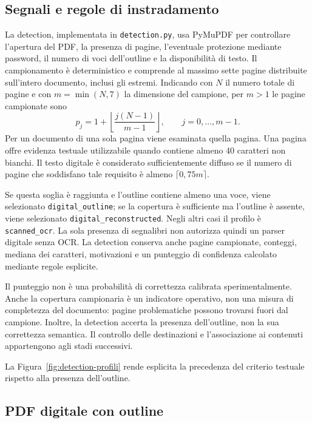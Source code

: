 \subsection{Segnali e regole di instradamento}

La detection, implementata in \texttt{detection.py}, usa PyMuPDF per controllare l'apertura del PDF, la presenza di pagine, l'eventuale protezione mediante password, il numero di voci dell'outline e la disponibilità di testo. Il campionamento è deterministico e comprende al massimo sette pagine distribuite sull'intero documento, inclusi gli estremi. Indicando con $N$ il numero totale di pagine e con $m=\min(N,7)$ la dimensione del campione, per $m>1$ le pagine campionate sono
\begin{equation}
    p_j=1+\left\lfloor\frac{j(N-1)}{m-1}\right\rfloor,
    \qquad j=0,\ldots,m-1.
\end{equation}
Per un documento di una sola pagina viene esaminata quella pagina. Una pagina offre evidenza testuale utilizzabile quando contiene almeno 40 caratteri non bianchi. Il testo digitale è considerato sufficientemente diffuso se il numero di pagine che soddisfano tale requisito è almeno $\lceil0{,}75m\rceil$.

Se questa soglia è raggiunta e l'outline contiene almeno una voce, viene selezionato \texttt{digital\_outline}; se la copertura è sufficiente ma l'outline è assente, viene selezionato \texttt{digital\_reconstructed}. Negli altri casi il profilo è \texttt{scanned\_ocr}. La sola presenza di segnalibri non autorizza quindi un parser digitale senza OCR. La detection conserva anche pagine campionate, conteggi, mediana dei caratteri, motivazioni e un punteggio di confidenza calcolato mediante regole esplicite.

Il punteggio non è una probabilità di correttezza calibrata sperimentalmente. Anche la copertura campionaria è un indicatore operativo, non una misura di completezza del documento: pagine problematiche possono trovarsi fuori dal campione. Inoltre, la detection accerta la presenza dell'outline, non la sua correttezza semantica. Il controllo delle destinazioni e l'associazione ai contenuti appartengono agli stadi successivi.

La Figura~\ref{fig:detection-profili} rende esplicita la precedenza del criterio testuale rispetto alla presenza dell'outline.



\subsection{PDF digitale con outline}

